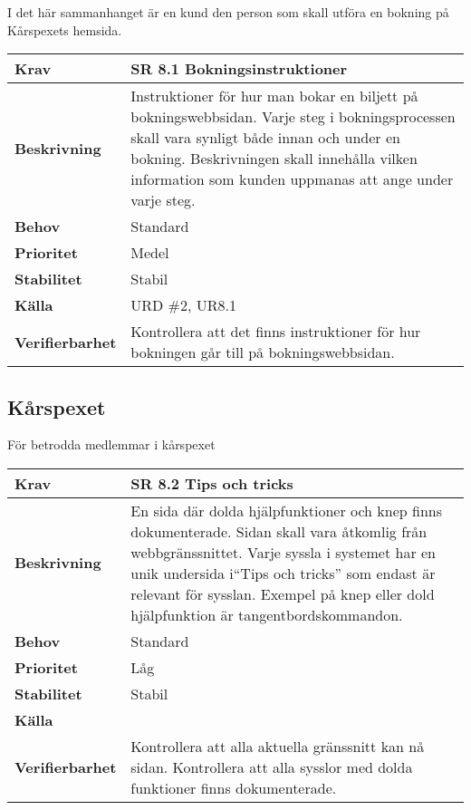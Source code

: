 \documentclass[a4paper, twoside, 11pt, titlepage]{article}
\begin{document}
	I det här sammanhanget är en kund den person som skall utföra en bokning på Kårspexets hemsida.

	\begin{tabular} { p{2.6cm} p{12.5cm} }
		\hline
		\sffamily\textbf{Krav} & \sffamily\textbf{SR 8.1 Bokningsinstruktioner } \\
		\hline
		\sffamily\textbf{Beskrivning} & Instruktioner för hur man bokar en biljett på bokningswebbsidan. Varje steg i bokningsprocessen skall vara synligt både innan och under en bokning. Beskrivningen skall innehålla vilken information som kunden uppmanas att ange under varje steg.  \\
		\hline
		\sffamily\textbf{Behov} & Standard  \\
		\hline
		\sffamily\textbf{Prioritet} & Medel  \\
		\hline
		\sffamily\textbf{Stabilitet} & Stabil  \\
		\hline
		\sffamily\textbf{Källa} & URD \#2, UR8.1  \\
		\hline
		\sffamily\textbf{Verifierbarhet} & Kontrollera att det finns instruktioner för hur bokningen går till på bokningswebbsidan.  \\
		\hline
	\end{tabular}


	\subsection{Kårspexet}


	För betrodda medlemmar i kårspexet

	\begin{tabular} { p{2.6cm} p{12.5cm} }
		\hline
		\sffamily\textbf{Krav} & \sffamily\textbf{SR 8.2 Tips och tricks } \\
		\hline
		\sffamily\textbf{Beskrivning} & En sida där dolda hjälpfunktioner och knep finns dokumenterade. Sidan skall vara åtkomlig från webbgränssnittet. Varje syssla i systemet har en unik undersida i``Tips och tricks'' som endast är relevant för sysslan. Exempel på knep eller dold hjälpfunktion är tangentbordskommandon.  \\
		\hline
		\sffamily\textbf{Behov} & Standard  \\
		\hline
		\sffamily\textbf{Prioritet} & Låg  \\
		\hline
		\sffamily\textbf{Stabilitet} & Stabil  \\
		\hline
		\sffamily\textbf{Källa} &   \\
		\hline
		\sffamily\textbf{Verifierbarhet} & Kontrollera att alla aktuella gränssnitt kan nå sidan. Kontrollera att alla sysslor med dolda funktioner finns dokumenterade.  \\
		\hline
	\end{tabular}
	\vspace{6mm}
\end{document}
